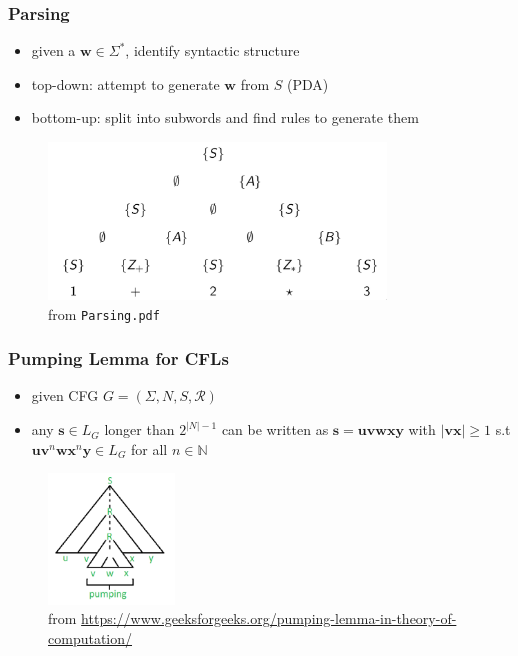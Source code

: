\documentclass{beamer}
\begin{document}
\begin{frame}
\frametitle{Parsing}
\begin{itemize}
  \item given a $\mathbf{w} \in \Sigma^*$, identify syntactic structure
  \item top-down: attempt to generate $\mathbf{w}$ from $S$ (PDA)
  \item bottom-up: split into subwords and find rules to generate them
\end{itemize}
\begin{figure}
  \includegraphics[width=0.8\textwidth]{Parse-tree.png}
  \caption{from \texttt{Parsing.pdf}}
\end{figure}
\end{frame}


\begin{frame}
\frametitle{Pumping Lemma for CFLs}
\begin{itemize}
  \item given CFG $G = (\Sigma, N, S, \mathcal{R})$
  \item any $\mathbf{s} \in L_G$ longer than $2^{\lvert N \rvert - 1}$ can be
    written as $\mathbf{s} = \mathbf{uvwxy}$ with $\lvert \mathbf{vx} \rvert
    \geq 1$ s.t
    $\mathbf{uv}^n\mathbf{wx}^n\mathbf{y} \in L_G$ for all $n \in \mathbb{N}$
\end{itemize}
\begin{figure}
  \includegraphics[width=0.3\textwidth]{CFL-pumping-lemma.png}
  \caption{from \url{https://www.geeksforgeeks.org/pumping-lemma-in-theory-of-computation/}}
  \end{figure}
\end{frame}
\end{document}
